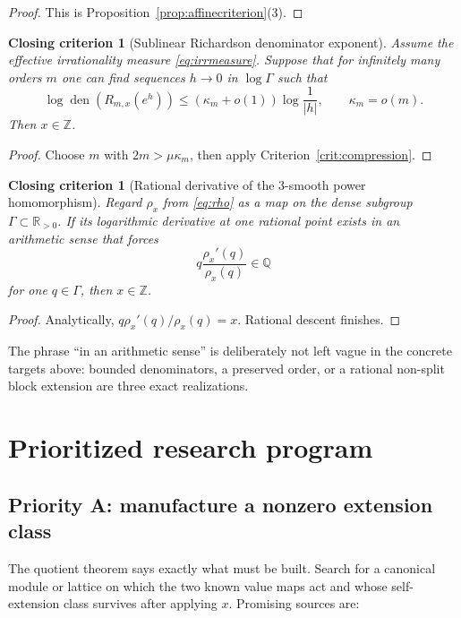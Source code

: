 \documentclass[11pt,oneside]{article}
\newtheorem{criterion}[theorem]{Closing criterion}
\theoremstyle{definition}
\theoremstyle{remark}
\newcommand{\Z}{\mathbb Z}
\newcommand{\Q}{\mathbb Q}
\newcommand{\R}{\mathbb R}
\newcommand{\den}{\operatorname{den}}
\begin{document}
\begin{proof}
This is Proposition~\ref{prop:affinecriterion}(3).
\end{proof}

\begin{criterion}[Sublinear Richardson denominator exponent]
\label{crit:sublinear}
Assume the effective irrationality measure \eqref{eq:irrmeasure}.  Suppose that for infinitely
many orders $m$ one can find sequences $h\to0$ in $\log\Gamma$ such that
\[
 \log\den(R_{m,x}(e^h))
 \le(\kappa_m+o(1))\log\frac1{|h|},
 \qquad
 \kappa_m=o(m).
\]
Then $x\in\Z$.
\end{criterion}

\begin{proof}
Choose $m$ with $2m>\mu\kappa_m$, then apply
Criterion~\ref{crit:compression}.
\end{proof}

\begin{criterion}[Rational derivative of the $3$-smooth power homomorphism]
\label{crit:derivativehomomorphism}
Regard $\rho_x$ from \eqref{eq:rho} as a map on the dense subgroup $\Gamma\subset\R_{>0}$.
If its logarithmic derivative at one rational point exists in an arithmetic sense that forces
\begin{equation}
 q\frac{\rho_x'(q)}{\rho_x(q)}\in\Q
 \label{eq:logderivative}
\end{equation}
for one $q\in\Gamma$, then $x\in\Z$.
\end{criterion}

\begin{proof}
Analytically, $q\rho_x'(q)/\rho_x(q)=x$.  Rational descent finishes.
\end{proof}

The phrase ``in an arithmetic sense'' is deliberately not left vague in the concrete targets
above: bounded denominators, a preserved order, or a rational non-split block extension are
three exact realizations.

\section{Prioritized research program}
\label{sec:program}

\subsection{Priority A: manufacture a nonzero extension class}

The quotient theorem says exactly what must be built.  Search for a canonical module or lattice
on which the two known value maps act and whose self-extension class survives after applying
$x$.  Promising sources are:
\end{document}

